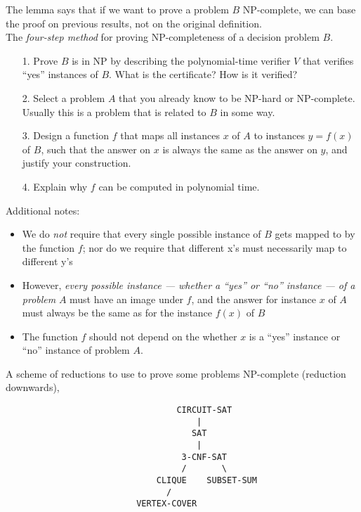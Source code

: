 \documentclass[12pt]{article}
\theoremstyle{plain}
\theoremstyle{definition}
\begin{document}
The lemma says that if we want to prove a problem $B$ NP-complete, we can base the proof on previous results, not on the original definition. \\
The \emph{four-step method} for proving NP-completeness of a decision problem $B$.
\begin{itemize}
  \item[1.] Prove $B$ is in NP by describing the polynomial-time verifier $V$ that verifies ``yes'' instances of $B$.
  What is the certificate?
  How is it verified?

  \item[2.] Select a problem $A$ that you already know to be NP-hard or NP-complete.
  Usually this is a problem that is related to $B$ in some way.

  \item[3.] Design a function $f$ that maps all instances $x$ of $A$ to instances $y = f(x)$ of $B$, such that the answer on $x$ is always the same as the answer on $y$, and justify your construction.

  \item[4.] Explain why $f$ can be computed in polynomial time.
\end{itemize}

Additional notes:
\begin{itemize}
  \item We do \emph{not} require that every single possible instance of $B$ gets  mapped to by the function $f$;
  nor do we require that different x's must necessarily map to different y's
  \item However, \emph{every possible instance --- whether a ``yes'' or ``no'' instance --- of a problem} $A$ must have an image under $f$, and the answer for instance $x$ of $A$ must always be the same as for the instance $f(x)$ of $B$
  \item The function $f$ should not depend on the whether $x$ is a ``yes'' instance or ``no'' instance of problem $A$.
\end{itemize}

A scheme of reductions to use to prove some problems NP-complete (reduction downwards),
\begin{verbatim}
                                  CIRCUIT-SAT
                                      |
                                     SAT
                                      |
                                   3-CNF-SAT
                                   /       \
                              CLIQUE    SUBSET-SUM
                                /
                          VERTEX-COVER
\end{verbatim}
\end{document}
